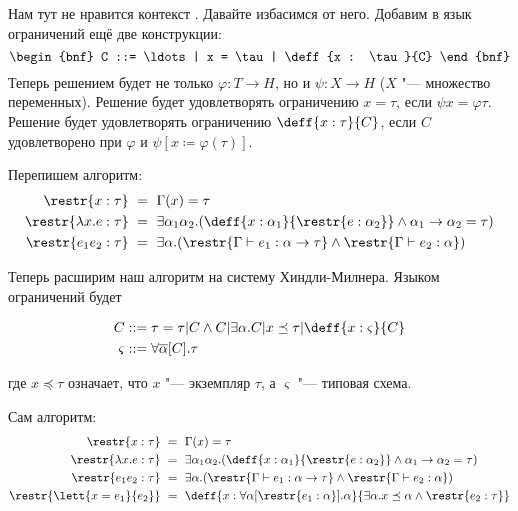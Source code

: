 Нам тут не нравится контекст \todo. Давайте избасимся от него.
Добавим в язык ограничений ещё две конструкции:
\[
\begin{bnf}
    C ::= \ldots | x = \tau | \deff{x : \tau}{C}
\end{bnf}
\]
Теперь решением будет не только $\varphi : T \rightarrow H$, но и $\psi : X \rightarrow H$ ($X$ "--- множество переменных).
Решение будет удовлетворять ограничению $x = \tau$, если $\psi x = \varphi \tau$.
Решение будет удовлетворять ограничению $\deff{x:\tau}{C}$, если $C$ удовлетворено при $\varphi$ и $\psi[x \coloneqq \varphi(\tau)]$.

Перепишем алгоритм:
\begin{align*}
    \restr{x : \tau} \ &=\  \Gamma(x) = \tau \\
    \restr{\lambda x . e : \tau} \ &=\ 
        \exists \alpha_1 \alpha_2 . (\deff{x : \alpha_1}{\restr{e:\alpha_2}} \land \alpha_1\rightarrow\alpha_2=\tau) \\
    \restr{e_1 e_2 : \tau} \ &=\ 
        \exists\alpha.(\restr{\Gamma\vdash e_1 :\alpha\rightarrow\tau} \land \restr{\Gamma\vdash e_2 : \alpha})
\end{align*}

Теперь расширим наш алгоритм на систему Хиндли-Милнера. Языком ограничений будет
\begin{bnf}
\begin{align*}
    C &::= \tau = \tau | C \land C | \exists \alpha . C | x \preceq \tau | \deff{x : \varsigma}{C} \\
    \varsigma &::= \forall \overline\alpha[C] . \tau
\end{align*}
\end{bnf}
где $x \preceq \tau$ означает, что $x$ "--- экземпляр $\tau$, а $\varsigma$ "--- типовая схема.

Сам алгоритм:
\begin{align*}
    \restr{x : \tau} \ &=\  \Gamma(x) = \tau \\
    \restr{\lambda x . e : \tau} \ &=\ 
        \exists \alpha_1 \alpha_2 . (\deff{x : \alpha_1}{\restr{e:\alpha_2}} \land \alpha_1\rightarrow\alpha_2=\tau) \\
    \restr{e_1 e_2 : \tau} \ &=\ 
        \exists\alpha.(\restr{\Gamma\vdash e_1 :\alpha\rightarrow\tau} \land \restr{\Gamma\vdash e_2 : \alpha}) \\
    \restr{\lett{x = e_1}{e_2}} \ &=\ \deff{x : \forall \alpha[\restr{e_1 : \alpha}].\alpha}
        {\exists \alpha . x \preceq \alpha \land \restr{e_2:\tau}}
\end{align*}
\todo
